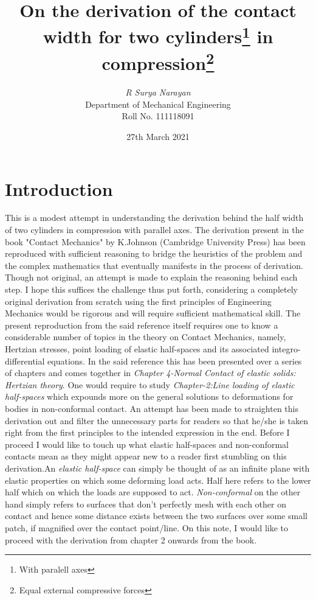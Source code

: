 \documentclass{article}
\title{\textbf{On the derivation of the contact width for two cylinders\thanks{With paralell axes}  in compression\thanks{Equal external compressive forces}}}
\author{\textit{R Surya Narayan}\\Department of Mechanical Engineering\\ Roll No. 111118091}
\date{27th March 2021}
\begin{document}
\maketitle
\section{Introduction}
This is a modest attempt in understanding the derivation behind the half width of two cylinders in compression with parallel axes. The derivation present in the book "Contact Mechanics" by K.Johnson (Cambridge University Press) has been reproduced with sufficient reasoning to bridge the heuristics of the problem and the complex mathematics that eventually manifests in the process of derivation. Though not original, an attempt is made to explain the reasoning behind each step. I hope this suffices the challenge thus put forth, considering a completely original derivation from scratch using the first principles of Engineering Mechanics would be rigorous and will require sufficient mathematical skill. The present reproduction from the said reference itself requires one to know a considerable number of topics in the theory on Contact Mechanics, namely, Hertzian stresses, point loading of elastic half-spaces and its associated integro-differential equations. In the said reference this has been presented over a series of chapters and comes together in \textit{Chapter 4-Normal Contact of elastic solids: Hertzian theory}. One would require to study \textit{Chapter-2:Line loading of elastic half-spaces} which expounds more on the general solutions to deformations for bodies in non-conformal contact. An attempt has been made to straighten this derivation out and filter the unnecessary parts for readers so that he/she is taken right from the first principles to the intended expression in the end. Before I proceed I would like to touch up what elastic half-spaces and non-conformal contacts mean as they might appear new to a reader first stumbling on this derivation.An \textit{elastic half-space} can simply be thought of as an infinite plane with elastic properties on which some deforming load acts. Half here refers to the lower half which on which the loads are supposed to act. \textit{Non-conformal} on the other hand simply refers to surfaces that don't perfectly mesh with each other on contact and hence some distance exists between the two surfaces over some small patch, if magnified over the contact point/line. On this note, I would like to proceed with the derivation from chapter 2 onwards from the book.  
\end{document}
